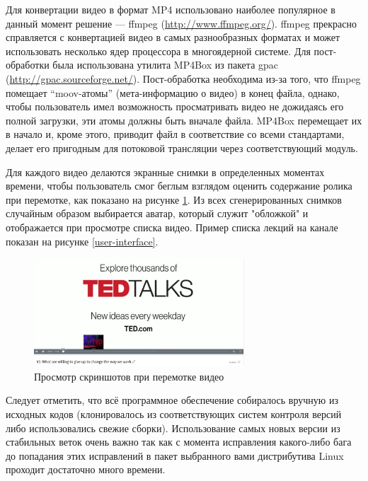 Для конвертации видео в формат MP4 использовано наиболее популярное в данный момент решение — ffmpeg (\url{http://www.ffmpeg.org/}).
ffmpeg прекрасно справляется с конвертацией видео в самых разнообразных форматах и может использовать несколько ядер
процессора в многоядерной системе. Для пост-обработки была использована утилита MP4Box из пакета gpac (\url{http://gpac.sourceforge.net/}).
Пост-обработка необходима из-за того, что ffmpeg помещает “moov-атомы” (мета-информацию о видео) в конец файла, однако,
чтобы пользователь имел возможность просматривать видео не дожидаясь его полной загрузки, эти атомы должны быть
вначале файла. MP4Box перемещает их в начало и, кроме этого, приводит файл в соответствие со всеми стандартами,
делает его пригодным для потоковой трансляции через соответствующий модуль.

Для каждого видео делаются экранные снимки в определенных моментах времени, чтобы пользователь смог беглым взглядом
оценить содержание ролика при перемотке, как показано на рисунке \ref{thumbnails}. Из всех сгенерированных снимков
случайным образом выбирается аватар, который служит "обложкой" и отображается при просмотре списка видео. Пример списка
лекций на канале показан на рисунке \ref{user-interface}.

\begin{figure}
  \centering
  \includegraphics[width=0.7\textwidth]{images/thumbnails.jpg}
  \caption{Просмотр скриншотов при перемотке видео}\label{thumbnails}
\end{figure}

\FloatBarrier


Следует отметить, что всё программное обеспечение собиралось вручную из исходных кодов (клонировалось из соответствующих
систем контроля версий либо использовались свежие сборки). Использование самых новых версии из стабильных веток очень важно
так как с момента исправления какого-либо бага до попадания этих исправлений в пакет выбранного вами дистрибутива Linux
проходит достаточно много времени.